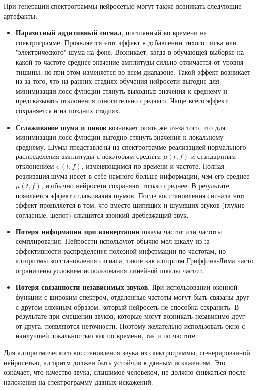 При генерации спектрограммы нейросетью могут также возникать следующие артефакты:
\begin{itemize}
  \item \textbf{Паразитный аддитивный сигнал}, постоянный во времени на спектрограмме. 
  Проявляется этот эффект в добавлении тихого писка или "электрического" шума на фоне.
  Возникает, когда в обучающей выборке на какой-то частоте среднее значение амплитуды сильно отличается от уровня тишины, но при этом изменяется во всем диапазоне.
  Такой эффект возникает из-за того, что на ранних стадиях обучения нейросети выгодно для минимизации лосс-функции стянуть выходные значения к среднему 
  и предсказывать отклонения относительно среднего. Чаще всего эффект сохраняется и на поздних стадиях.
  \item \textbf{Сглаживание шума и пиков} возникает опять же из-за того, что для минимизации лосс-функции выгодно стянуть значения к локальному среднему.
  Шумы представлены на спектрограмме реализацией нормального распределения амплитуды с некоторым средним $\mu(t,f)$ и стандартным отклонением $\sigma(t,f)$, изменяющимся по времени и частоте.
  Полная реализация шума несет в себе намного больше информации, чем его среднее $\mu(t,f)$, и обычно нейросети сохраняют только среднее. 
  В результате появляется эффект сглаживания шумов. После восстановления сигнала этот эффект проявляется в том, что вместо шипящих и шумящих звуков (глухие согласные, шепот)
  слышится звонкий дребезжащий звук. 
  \item \textbf{Потеря информации при конвертации} шкалы частот или частоты семплирования. 
  Нейросети используют обычно мел-шкалу из-за эффективности распределения полезной информации по частотам, 
  но алгоритмы восстановления сигнала, такие как алгоритм Гриффина-Лима часто ограничены условием использования линейной шкалы частот. 
  \item \textbf{Потеря связанности независимых звуков}. При использовании оконной функции с широким спектром, 
  отдаленные частоты могут быть связаны друг с другом сложным образом, который нейросеть не способна сохранить. 
  В результате при смешении звуков, которые могут возникать независимо друг от друга, появляются неточности. 
  Поэтому желательно использовать окно с наилучшей локальностью как по времени, так и по частоте.
\end{itemize}
Для алгоритмического восстановления звука из спектрограммы, сгенерированной нейросетью, алгоритм должен быть устойчив к данным искажениям. 
Это означает, что качество звука, слышимое человеком, не должно снижаться после наложения на спектрограмму данных искажений.



